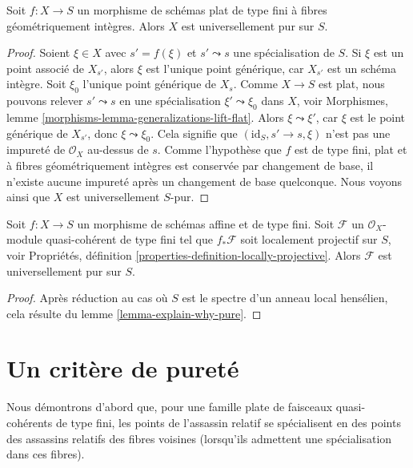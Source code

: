 \begin{lemma}
\label{lemma-flat-geometrically-integral-fibres-pure}
Soit $f : X \to S$ un morphisme de schémas plat de type fini
à fibres géométriquement intègres. Alors $X$ est universellement pur
sur $S$.
\end{lemma}

\begin{proof}
Soient $\xi \in X$ avec $s' = f(\xi)$ et $s' \leadsto s$ une spécialisation
de $S$. Si $\xi$ est un point associé de $X_{s'}$, alors $\xi$ est
l'unique point générique, car $X_{s'}$ est un schéma intègre. Soit
$\xi_0$ l'unique point générique de $X_s$. Comme $X \to S$ est plat,
nous pouvons relever $s' \leadsto s$ en une spécialisation
$\xi' \leadsto \xi_0$ dans $X$, voir
Morphismes, lemme \ref{morphisms-lemma-generalizations-lift-flat}.
Alors $\xi \leadsto \xi'$, car $\xi$ est le point générique de $X_{s'}$,
donc $\xi \leadsto \xi_0$. Cela signifie que $(\text{id}_S, s' \to s, \xi)$
n'est pas une impureté de $\mathcal{O}_X$ au-dessus de $s$. Comme l'hypothèse
que $f$ est de type fini, plat et à fibres géométriquement intègres
est conservée par changement de base, il n'existe aucune
impureté après un changement de base quelconque. Nous voyons ainsi que $X$ est
universellement $S$-pur.
\end{proof}

\begin{lemma}
\label{lemma-affine-locally-projective-pure}
Soit $f : X \to S$ un morphisme de schémas affine et de type fini.
Soit $\mathcal{F}$ un $\mathcal{O}_X$-module quasi-cohérent de type fini
tel que $f_*\mathcal{F}$ soit localement projectif sur $S$, voir
Propriétés, définition \ref{properties-definition-locally-projective}.
Alors $\mathcal{F}$ est universellement pur sur $S$.
\end{lemma}

\begin{proof}
Après réduction au cas où $S$ est le spectre d'un anneau local
hensélien, cela résulte du
lemme \ref{lemma-explain-why-pure}.
\end{proof}




\section{Un critère de pureté}
\label{section-criterion-purity}

\noindent
Nous démontrons d'abord que, pour une famille plate de faisceaux
quasi-cohérents de type fini, les points de l'assassin relatif
se spécialisent en des points des assassins relatifs des fibres voisines
(lorsqu'ils admettent une spécialisation dans ces fibres).

